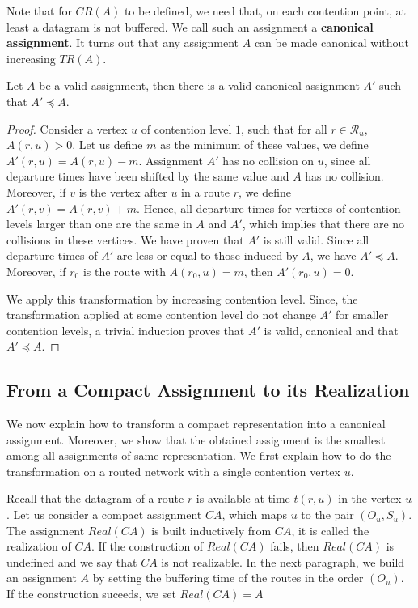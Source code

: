 \documentclass[english]{article}
\begin{document}
Note that for $CR(A)$ to be defined, we need that, on each contention point, at least a datagram is not buffered. We call such an assignment a \textbf{canonical assignment}. It turns out that any assignment $A$ can be made canonical without increasing $TR(A)$.

\begin{lemma}\label{lemma:canonical_min}
Let $A$ be a valid assignment, then there is a valid canonical assignment $A'$ such that $A' \preceq A$.
\end{lemma}
\begin{proof}
Consider a vertex $u$ of contention level $1$, such that for all $r \in \mathcal{R}_u$, $A(r,u) > 0$. Let us define $m$ as the minimum of these values, we define $A'(r,u) = A(r,u) - m$. Assignment $A'$ has no collision on $u$, since all departure times have been shifted by the same value and $A$ has no collision. Moreover, if $v$ is the vertex after $u$ in a route $r$, we define  $A'(r,v) = A(r,v) + m$. Hence, all departure times for vertices of contention levels larger than one are the same in $A$ and $A'$, which implies that there are no collisions in these vertices. We have proven that $A'$ is still valid. Since all departure times of $A'$ are less or equal to those induced by $A$, we have $A' \preceq A$. Moreover, if $r_0$ is the route with $A(r_0,u) = m$, then $A'(r_0,u) = 0$. 

We apply this transformation by increasing contention level. Since, the transformation applied at some contention level do not change $A'$ for smaller contention levels, a trivial induction proves that $A'$ is valid, canonical and that $A' \preceq A$.
\end{proof}


\subsection{From a Compact Assignment to its Realization}


We now explain how to transform a compact representation into a canonical assignment.
Moreover, we show that the obtained assignment is the smallest among all assignments of same representation. We first explain how to do the transformation on a routed network with a single contention vertex $u$.

Recall that the datagram of a route $r$ is available at time $t(r,u)$ in the vertex $u$.
Let us consider a compact assignment $CA$, which maps $u$ to the pair $(O_u,S_u)$.
The assignment $Real(CA)$ is built inductively from $CA$, it is called the realization of $CA$. 
If the construction of $Real(CA)$ fails, then $Real(CA)$ is undefined and we say that $CA$ is not realizable. In the next paragraph, we build an assignment $A$ by setting the buffering time of the routes in the order
 $(O_u)$. If the construction suceeds, we set $Real(CA) = A$ 
\end{document}

